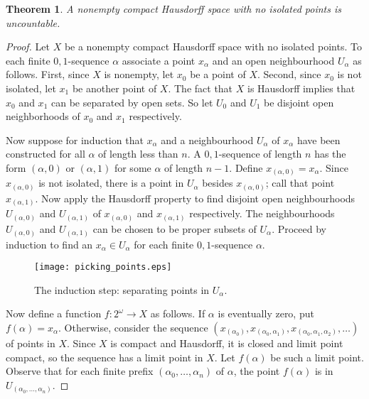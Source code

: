 \documentclass[12pt]{article}
\newtheorem*{theorem*}{Theorem}
\begin{document}

\begin{theorem*}
A nonempty compact Hausdorff space with no isolated points is uncountable.
\end{theorem*}

\begin{proof}
Let $X$ be a nonempty compact Hausdorff space with no isolated points.  
To each finite $0,1$-sequence $\alpha$ associate a point $x_{\alpha}$ and an open neighbourhood $U_{\alpha}$ as follows.  First, since $X$ is nonempty, let $x_0$ be a point of $X$.  Second, since $x_0$ is not isolated, let $x_1$ be another point of $X$.  The fact that $X$ is Hausdorff implies that $x_0$ and $x_1$ can be separated by open sets.  So let $U_0$ and $U_1$ be disjoint open neighborhoods of $x_0$ and $x_1$ respectively.

Now suppose for induction that $x_{\alpha}$ and a neighbourhood $U_{\alpha}$ of $x_{\alpha}$ have been constructed for all $\alpha$ of length less than $n$. A $0,1$-sequence of length $n$ has the form $(\alpha,0)$ or $(\alpha,1)$ for some $\alpha$ of length $n-1$.  Define $x_{(\alpha,0)}=x_{\alpha}$.  Since $x_{(\alpha,0)}$ is not isolated, there is a point in $U_{\alpha}$ besides $x_{(\alpha,0)}$; call that point $x_{(\alpha,1)}$.  Now apply the Hausdorff property to find disjoint open neighbourhoods $U_{(\alpha,0)}$ and $U_{(\alpha,1)}$ of $x_{(\alpha,0)}$ and $x_{(\alpha,1)}$ respectively.  The neighbourhoods $U_{(\alpha,0)}$ and $U_{(\alpha,1)}$ can be chosen to be proper subsets of $U_{\alpha}$.  Proceed by induction to find an $x_{\alpha}\in U_{\alpha}$ for each finite $0,1$-sequence $\alpha$.

\begin{figure}[hh]
\begin{centering}  
\texttt{[image: picking\_points.eps]}
\caption{The induction step: separating points in $U_{\alpha}$.}
\end{centering}
\end{figure}

Now define a function $f\colon 2^{\omega}\to X$ as follows.  If $\alpha$ is
eventually zero, put $f(\alpha)=x_{\alpha}$.  Otherwise, consider the sequence
$(x_{(\alpha_0)},x_{(\alpha_0,\alpha_1)},x_{(\alpha_0,\alpha_1,\alpha_2)},\dots)$ of points in $X$.  Since $X$ is compact and Hausdorff, it is closed and limit point compact, so the sequence has a limit point in $X$.  Let $f(\alpha)$ be such a limit point.  Observe that for each finite prefix $(\alpha_0,\dots,\alpha_n)$ of $\alpha$, the point $f(\alpha)$ is in $U_{(\alpha_0,\dots,\alpha_n)}$.


\end{proof}
\end{document}
